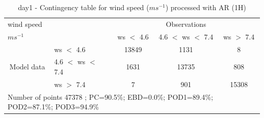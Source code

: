 \begin{table}[h!]
\begin{center}
\begin{tabular}{llccc}
\hline
{wind speed}                                       &                                                    & \multicolumn{3}{c}{Observations}                 \\
{$m s^{-1}$}                                       &                             & ws $<$ 4.6   & 4.6 $<$ ws $<$ 7.4 & ws $>$ 7.4 \\
\hline
\multicolumn{1}{c}{\multirow{3}{*}{Model data}}  & ws $<$ 4.6             & 13849                & 1131                       & 8              \\
                                                 & 4.6  $<$ ws $<$ 7.4 & 1631                & 13735                       & 808              \\
                                                 & ws $>$ 7.4             & 7                & 901                       & 15308              \\
\hline 
\multicolumn{5}{l}{ Number of points        47378 ; PC=90.5\%; EBD=0.0\%; POD1=89.4\%; POD2=87.1\%; POD3=94.9\%}                 \\
\end{tabular}
\end{center}
\caption{day1 - Contingency table for  wind speed ($m s^{-1}$) processed with AR (1H)}
\label{tab:contingencywsAFT:day1}
\end{table}

